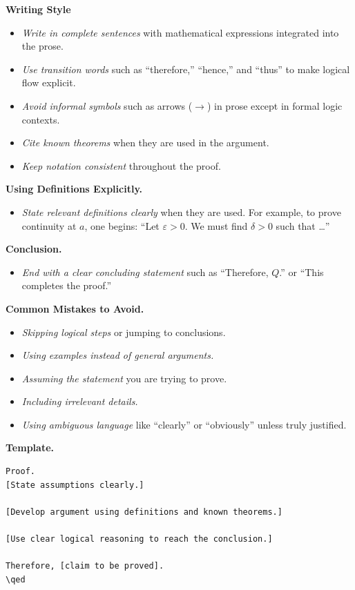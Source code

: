 \textbf{Writing Style}

\begin{itemize}

	\item \emph{Write in complete sentences} with mathematical expressions integrated into the prose.
    
	\item \emph{Use transition words} such as ``therefore,'' ``hence,'' and ``thus'' to make logical flow explicit.
    
	\item \emph{Avoid informal symbols} such as arrows (\(\rightarrow\)) in prose except in formal logic contexts.
    
	\item \emph{Cite known theorems} when they are used in the argument.
    
	\item \emph{Keep notation consistent} throughout the proof.

\end{itemize}

\textbf{Using Definitions Explicitly.}

\begin{itemize}

	\item \emph{State relevant definitions clearly} when they are used.  
	For example, to prove continuity at \(a\), one begins:  
    ``Let \(\varepsilon > 0\). We must find \(\delta > 0\) such that \dots''

\end{itemize}

\textbf{Conclusion.}

\begin{itemize}
    \item \emph{End with a clear concluding statement} such as ``Therefore, \(Q\).'' or ``This completes the proof.''
\end{itemize}

\textbf{Common Mistakes to Avoid.}

\begin{itemize}

	\item \emph{Skipping logical steps} or jumping to conclusions.
    
	\item \emph{Using examples instead of general arguments.}
    
	\item \emph{Assuming the statement} you are trying to prove.
    
	\item \emph{Including irrelevant details.}
    
	\item \emph{Using ambiguous language} like ``clearly'' or ``obviously'' unless truly justified.

\end{itemize}

\textbf{Template.}

\begin{verbatim}
Proof.
[State assumptions clearly.]

[Develop argument using definitions and known theorems.]

[Use clear logical reasoning to reach the conclusion.]

Therefore, [claim to be proved].
\qed
\end{verbatim}
